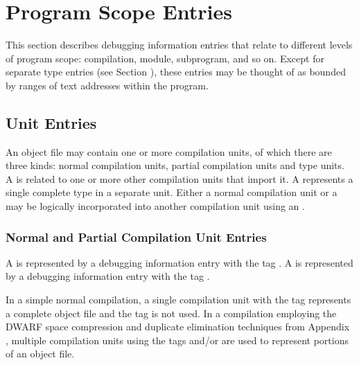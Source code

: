 \chapter{Program Scope Entries}
\label{chap:programscopeentries} 
This section describes debugging information entries that
relate to different levels of program scope: compilation,
module, subprogram, and so on. Except for separate type
entries (see Section ), 
these entries may be thought of
as bounded by ranges of text addresses within the program.

\section{Unit Entries}
An object file may contain one or more compilation units,
of which there are
three kinds: 
normal compilation units,
partial compilation units and 
type units. A 
is related to one or more other compilation units that
import it. A 
 represents 
a single complete type in a
separate unit. Either a normal compilation unit or a 
may be logically incorporated into another
compilation unit using an 
.

\subsection[Normal and Partial CU Entries]{Normal and Partial Compilation Unit Entries}
\label{chap:normalandpartialcompilationunitentries}

A  is represented by a debugging
information entry with the 
tag . 
A  is represented by a debugging information
entry with the 
tag .

In a simple normal compilation, a single compilation unit with
the tag 
 represents a complete object file
and the tag 
 is not used. 
In a compilation
employing the DWARF space compression and duplicate elimination
techniques from 
Appendix , 
multiple compilation units using
the tags 
 and/or 
 are
used to represent portions of an object file.


